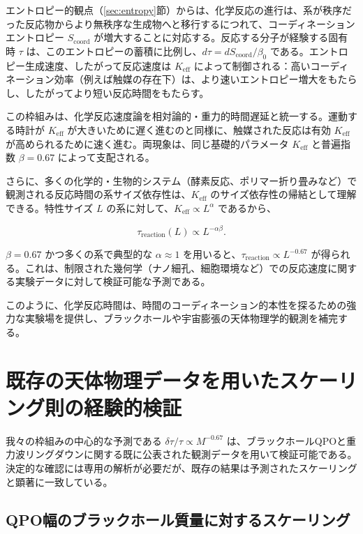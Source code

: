 \documentclass[12pt,a4paper]{article}
\newcommand{\Keff}{K_{\mathrm{eff}}}
\newcommand{\Scoord}{S_{\mathrm{coord}}}
\begin{document}
	エントロピー的観点（\ref{sec:entropy}節）からは、化学反応の進行は、系が秩序だった反応物からより無秩序な生成物へと移行するにつれて、コーディネーションエントロピー \(\Scoord\) が増大することに対応する。反応する分子が経験する固有時 \(\tau\) は、このエントロピーの蓄積に比例し、\(d\tau = d\Scoord / \beta_0\) である。エントロピー生成速度、したがって反応速度は \(\Keff\) によって制御される：高いコーディネーション効率（例えば触媒の存在下）は、より速いエントロピー増大をもたらし、したがってより短い反応時間をもたらす。
	
	この枠組みは、化学反応速度論を相対論的・重力的時間遅延と統一する。運動する時計が \(\Keff\) が大きいために遅く進むのと同様に、触媒された反応は有効 \(\Keff\) が高められるために速く進む。両現象は、同じ基礎的パラメータ \(\Keff\) と普遍指数 \(\beta = 0.67\) によって支配される。
	
	さらに、多くの化学的・生物的システム（酵素反応、ポリマー折り畳みなど）で観測される反応時間の系サイズ依存性は、\(\Keff\) のサイズ依存性の帰結として理解できる。特性サイズ \(L\) の系に対して、\(\Keff \propto L^{\alpha}\) であるから、
	
	\begin{equation}
		\tau_{\mathrm{reaction}}(L) \propto L^{-\alpha\beta}.
	\end{equation}
	
	\(\beta = 0.67\) かつ多くの系で典型的な \(\alpha \approx 1\) を用いると、\(\tau_{\mathrm{reaction}} \propto L^{-0.67}\) が得られる。これは、制限された幾何学（ナノ細孔、細胞環境など）での反応速度に関する実験データに対して検証可能な予測である。
	
	このように、化学反応時間は、時間のコーディネーション的本性を探るための強力な実験場を提供し、ブラックホールや宇宙膨張の天体物理学的観測を補完する。
	
	\section{既存の天体物理データを用いたスケーリング則の経験的検証}
	\label{sec:empirical_test}
	
	我々の枠組みの中心的な予測である \(\delta\tau/\tau \propto M^{-0.67}\) は、ブラックホールQPOと重力波リングダウンに関する既に公表された観測データを用いて検証可能である。決定的な確認には専用の解析が必要だが、既存の結果は予測されたスケーリングと顕著に一致している。
	
	\subsection{QPO幅のブラックホール質量に対するスケーリング}
	
\end{document}
